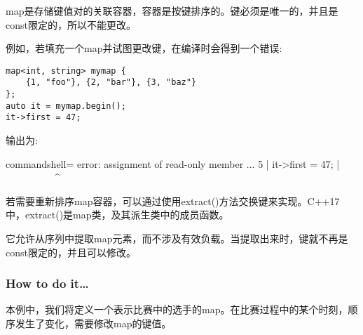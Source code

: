 
map是存储键值对的关联容器，容器是按键排序的。键必须是唯一的，并且是const限定的，所以不能更改。

例如，若填充一个map并试图更改键，在编译时会得到一个错误:

\begin{lstlisting}[style=styleCXX]
map<int, string> mymap {
	{1, "foo"}, {2, "bar"}, {3, "baz"}
};
auto it = mymap.begin();
it->first = 47;
\end{lstlisting}

输出为:

\begin{tcblisting}{commandshell={}}
error: assignment of read-only member ...
5 | it->first = 47;
   |  ~~~~~~~~~~^~~~
\end{tcblisting}

若需要重新排序map容器，可以通过使用extract()方法交换键来实现。C++17中，extract()是map类，及其派生类中的成员函数。

它允许从序列中提取map元素，而不涉及有效负载。当提取出来时，键就不再是const限定的，并且可以修改。

\subsubsection{How to do it…}

本例中，我们将定义一个表示比赛中的选手的map。在比赛过程中的某个时刻，顺序发生了变化，需要修改map的键值。


